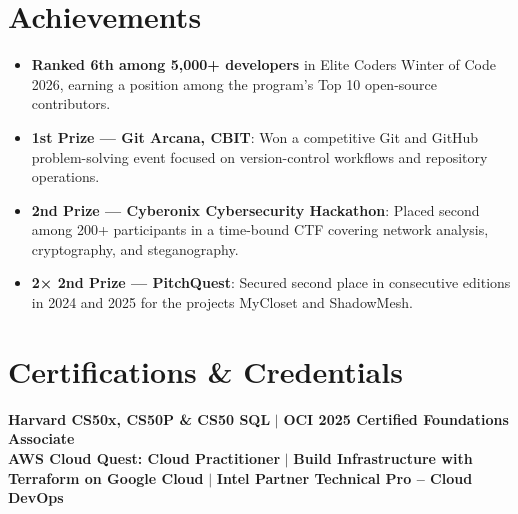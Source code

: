 \documentclass[letterpaper,11pt]{article}
\newcommand{\resumeItem}[1]{
  \item\small{
    {#1 \vspace{-2pt}}
  }
}
\newcommand{\resumeItemListStart}{\begin{itemize}}
\newcommand{\resumeItemListEnd}{\end{itemize}\vspace{-5pt}}
\begin{document}

\section{Achievements}
  \resumeItemListStart

    \resumeItem{\textbf{Ranked 6th among 5,000+ developers} in Elite Coders Winter of Code 2026, earning a position among the program's Top 10 open-source contributors.}

    \resumeItem{\textbf{1st Prize — Git Arcana, CBIT}: Won a competitive Git and GitHub problem-solving event focused on version-control workflows and repository operations.}

    \resumeItem{\textbf{2nd Prize — Cyberonix Cybersecurity Hackathon}: Placed second among 200+ participants in a time-bound CTF covering network analysis, cryptography, and steganography.}

    \resumeItem{\textbf{2× 2nd Prize — PitchQuest}: Secured second place in consecutive editions in 2024 and 2025 for the projects MyCloset and ShadowMesh.}

  \resumeItemListEnd


\section{Certifications \& Credentials}
\begin{itemize}[leftmargin=0.15in, label={}]
  \small{\item{
    \textbf{Harvard CS50x, CS50P \& CS50 SQL} $|$ 
    \textbf{OCI 2025 Certified Foundations Associate} \\
    \textbf{AWS Cloud Quest: Cloud Practitioner} $|$
    \textbf{Build Infrastructure with Terraform on Google Cloud} $|$
    \textbf{Intel Partner Technical Pro – Cloud DevOps}
  }}
\end{itemize}


\end{document}
